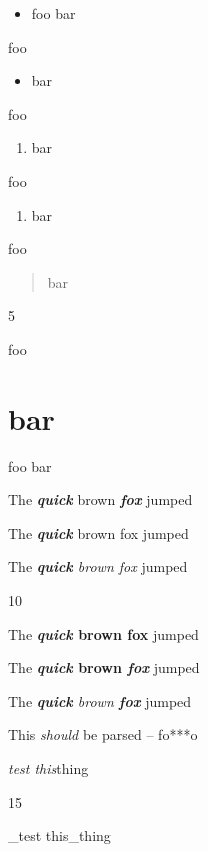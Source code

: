 
\def\mytitle{Edge Cases}


\begin{itemize}
\item{} foo
bar

\end{itemize}

foo

\begin{itemize}
\item{} bar

\end{itemize}

foo

\begin{enumerate}
\item{} bar

\end{enumerate}

foo

\begin{enumerate}
\item{} bar

\end{enumerate}

foo

\begin{quote}
bar
\end{quote}

5

foo

\part{bar}
\label{bar}

foo
bar

The \textbf{\emph{quick}} brown \textbf{\emph{fox}} jumped

The \textbf{\emph{quick}} brown fox jumped

The \emph{\textbf{quick} brown fox} jumped

10

The \textbf{\emph{quick} brown fox} jumped

The \textbf{\emph{quick} brown \emph{fox}} jumped

The \emph{\textbf{quick} brown \textbf{fox}} jumped

This \emph{should} be parsed -- fo***o

\emph{test this}thing

15

\_test this\_thing

